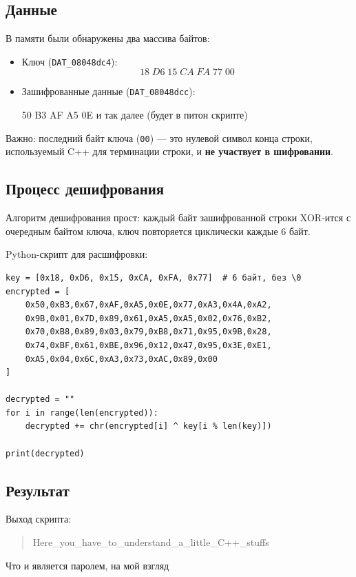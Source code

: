     \subsection{Данные}

    В памяти были обнаружены два массива байтов:

    \begin{itemize}
        \item Ключ (\texttt{DAT\_08048dc4}):
        \[
            18 \; D6 \; 15 \; CA \; FA \; 77 \; 00
        \]
        \item Зашифрованные данные (\texttt{DAT\_08048dcc}):

    50 \; B3  \; AF \; A5 \; 0E \; и так далее (будет в питон скрипте)

    \end{itemize}

    Важно: последний байт ключа (\texttt{00}) — это нулевой символ конца строки, используемый C++ для терминации строки, и \textbf{не участвует в шифровании}.


    \subsection{Процесс дешифрования}

    Алгоритм дешифрования прост: каждый байт зашифрованной строки XOR-ится с очередным байтом ключа, ключ повторяется циклически каждые 6 байт.

    Python-скрипт для расшифровки:

    \begin{verbatim}
key = [0x18, 0xD6, 0x15, 0xCA, 0xFA, 0x77]  # 6 байт, без \0
encrypted = [
    0x50,0xB3,0x67,0xAF,0xA5,0x0E,0x77,0xA3,0x4A,0xA2,
    0x9B,0x01,0x7D,0x89,0x61,0xA5,0xA5,0x02,0x76,0xB2,
    0x70,0xB8,0x89,0x03,0x79,0xB8,0x71,0x95,0x9B,0x28,
    0x74,0xBF,0x61,0xBE,0x96,0x12,0x47,0x95,0x3E,0xE1,
    0xA5,0x04,0x6C,0xA3,0x73,0xAC,0x89,0x00
]

decrypted = ""
for i in range(len(encrypted)):
    decrypted += chr(encrypted[i] ^ key[i % len(key)])

print(decrypted)
    \end{verbatim}


    \subsection{Результат}

    Выход скрипта:

    \begin{quote}
        Here\_you\_have\_to\_understand\_a\_little\_C++\_stuffs
    \end{quote}
    Что и является паролем, на мой взгляд


